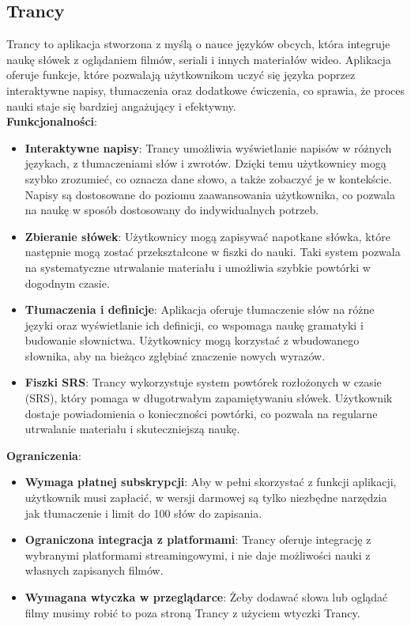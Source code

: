 \subsection{Trancy}
Trancy to aplikacja stworzona z myślą o nauce języków obcych, która integruje naukę słówek z oglądaniem filmów, seriali i innych materiałów wideo. Aplikacja oferuje funkcje, które pozwalają użytkownikom uczyć się języka poprzez interaktywne napisy, tłumaczenia oraz dodatkowe ćwiczenia, co sprawia, że proces nauki staje się bardziej angażujący i efektywny. \\
\textbf{Funkcjonalności}:
\begin{itemize}
    \item \textbf{Interaktywne napisy}: Trancy umożliwia wyświetlanie napisów w różnych językach, z tłumaczeniami słów i zwrotów. Dzięki temu użytkownicy mogą szybko zrozumieć, co oznacza dane słowo, a także zobaczyć je w kontekście. Napisy są dostosowane do poziomu zaawansowania użytkownika, co pozwala na naukę w sposób dostosowany do indywidualnych potrzeb.
    \item \textbf{Zbieranie słówek}: Użytkownicy mogą zapisywać napotkane słówka, które następnie mogą zostać przekształcone w fiszki do nauki. Taki system pozwala na systematyczne utrwalanie materiału i umożliwia szybkie powtórki w dogodnym czasie.
    \item \textbf{Tłumaczenia i definicje}: Aplikacja oferuje tłumaczenie słów na różne języki oraz wyświetlanie ich definicji, co wspomaga naukę gramatyki i budowanie słownictwa. Użytkownicy mogą korzystać z wbudowanego słownika, aby na bieżąco zgłębiać znaczenie nowych wyrazów.
    \item \textbf{Fiszki SRS}: Trancy wykorzystuje system powtórek rozłożonych w czasie (SRS), który pomaga w długotrwałym zapamiętywaniu słówek. Użytkownik dostaje powiadomienia o konieczności powtórki, co pozwala na regularne utrwalanie materiału i skuteczniejszą naukę.
\end{itemize}
\textbf{Ograniczenia}:
\begin{itemize}
    \item \textbf{Wymaga płatnej subskrypcji}: Aby w pełni skorzystać z funkcji aplikacji, użytkownik musi zapłacić, w wersji darmowej są tylko niezbędne narzędzia jak tłumaczenie i limit do 100 słów do zapisania.
    \item \textbf{Ograniczona integracja z platformami}: Trancy oferuje integrację z wybranymi platformami streamingowymi, i nie daje możliwości nauki z własnych zapisanych filmów.
    \item \textbf{Wymagana wtyczka w przeglądarce}: Żeby dodawać słowa lub oglądać filmy musimy robić to poza stroną Trancy z użyciem wtyczki Trancy.
\end{itemize}